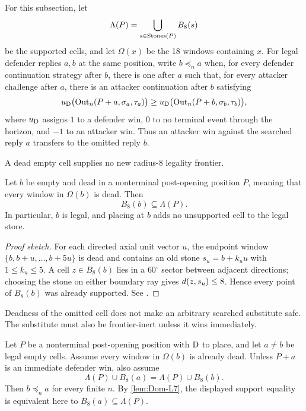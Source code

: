 For this subsection, let
\[
 \Lambda(P)=\bigcup_{s\in\operatorname{Stones}(P)}B_8(s)
\]
be the supported cells, and let $\Omega(x)$ be the 18 windows containing
$x$.  For legal defender replies $a,b$ at the same position, write
$b\preceq_n a$ when, for every defender continuation strategy after $b$,
there is one after $a$ such that, for every attacker challenge after $a$,
there is an attacker continuation after $b$ satisfying
\[
 u_{\mathrm{D}}\bigl(\operatorname{Out}_n(P+a,\sigma_a,\tau_a)\bigr)
 \ge
 u_{\mathrm{D}}\bigl(\operatorname{Out}_n(P+b,\sigma_b,\tau_b)\bigr),
\]
where $u_{\mathrm{D}}$ assigns $1$ to a defender win, $0$ to no terminal event through
the horizon, and $-1$ to an attacker win.  Thus an attacker win against the
searched reply $a$ transfers to the omitted reply $b$.

A dead empty cell supplies no new radius-$8$ legality frontier.

\begin{lemma}
\label{lem:Dom-L7}
Let $b$ be empty and dead in a nonterminal post-opening position $P$, meaning
that every window in $\Omega(b)$ is dead.  Then
\[
 B_8(b)\subseteq\Lambda(P).
\]
In particular, $b$ is legal, and placing at $b$ adds no unsupported
cell to the legal store.
\end{lemma}

\begin{proof}[Proof sketch]
For each directed axial unit vector $u$, the endpoint window
$\{b,b+u,\ldots,b+5u\}$ is dead and contains an old stone
$s_u=b+k_u u$ with $1\le k_u\le5$.  A cell $z\in B_8(b)$ lies in a
$60^\circ$ sector between adjacent directions; choosing the stone on either
boundary ray gives $d(z,s_u)\le8$.  Hence every point of $B_8(b)$ was
already supported.  See \cite{hexobot-companions}.
\end{proof}

Deadness of the omitted cell does not make an arbitrary searched substitute
safe.  The substitute must also be frontier-inert unless it wins immediately.

\begin{proposition}
\label{prop:Dom-P1}
Let $P$ be a nonterminal post-opening position with $\mathrm{D}$ to place, and let
$a\ne b$ be legal empty cells.  Assume every window in $\Omega(b)$ is already
dead.  Unless $P+a$ is an immediate defender win, also assume
\[
 \Lambda(P)\cup B_8(a)=\Lambda(P)\cup B_8(b).
\]
Then $b\preceq_n a$ for every finite $n$.  By \cref{lem:Dom-L7}, the displayed
support equality is equivalent here to $B_8(a)\subseteq\Lambda(P)$.
\end{proposition}

